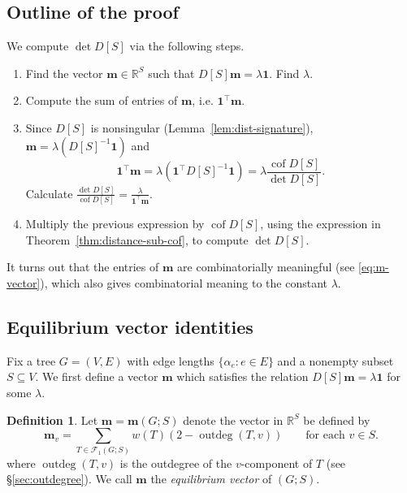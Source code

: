 \documentclass[12pt]{amsart}
\theoremstyle{definition}
\newtheorem{dfn}[thm]{Definition}
\newcommand{\RR}{\mathbb{R}}
\newcommand{\bone}{\mathbf{1}}
\newcommand{\boldm}{\mathbf{m}}
\newcommand{\tr}{\intercal}
\DeclareMathOperator{\cof}{cof}
\newcommand{\trees}{\mathcal{F}_1}
\DeclareMathOperator{\outdeg}{outdeg}
\begin{document}
\subsection{Outline of the proof}
\label{sec:proof_outline}

We compute $\det D[S]$ via the following steps.

\begin{enumerate}[label=(\Roman*)]
\item
Find the vector $\boldm \in \RR^S$ such that $D[S]\boldm = \lambda \bone$.
Find $\lambda$.

\item 
Compute the sum of entries of $\boldm$, i.e. $\bone^\tr \boldm$.

\item 
Since $D[S]$ is nonsingular (Lemma~\ref{lem:dist-signature}), $\boldm = \lambda (D[S]^{-1} \bone)$ and
\[
	\bone^\tr \boldm = \lambda (\bone^\tr D[S]^{-1} \bone) = \lambda \frac{\cof D[S]}{\det D[S]}.
\]
Calculate $\displaystyle \frac{\det D[S]}{\cof D[S]} = \frac{\lambda}{\bone^\tr \boldm}$.


\item
Multiply the previous expression by $\cof D[S]$, using the expression in Theorem~\ref{thm:distance-sub-cof}, to compute $\det D[S]$.
\end{enumerate}


It turns out that the entries of $\boldm$ are combinatorially meaningful (see \eqref{eq:m-vector}),
which also gives combinatorial meaning to
the constant $\lambda$.

\subsection{Equilibrium vector identities}\label{sec:equilibrium-vec}

Fix a tree $G = (V,E)$ with edge lengths $\{\alpha_e \colon e \in E\}$ and a nonempty subset $S \subseteq V$.
We first define a vector $\boldm$ which satisfies the relation $D[S] \boldm = \lambda \bone$ for some $\lambda$.

\begin{dfn}
\label{dfn:m-vector}
Let $\boldm = \boldm(G;S)$ denote the vector in $\RR^S$ be defined by
\begin{equation}\label{eq:m-vector}
\boldm_v =  \sum_{T \in \trees(G;S)} w({T}) (2 - \outdeg(T,v))
\qquad\text{for each }v \in S.
\end{equation}
where $\outdeg(T,v)$ is the outdegree of the $v$-component of $T$ (see \S\ref{sec:outdegree}).
We call $\boldm$ the {\em equilibrium vector} of $(G; S)$.
\end{dfn}
\end{document}
